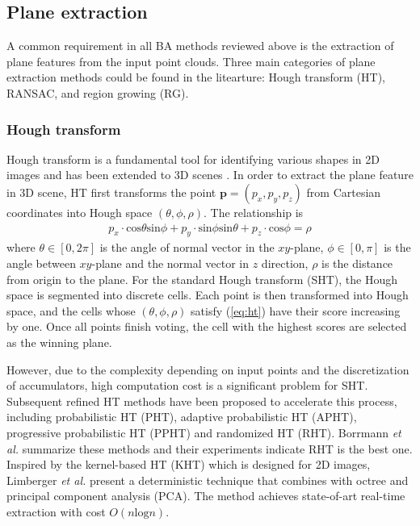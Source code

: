 \documentclass[letterpaper, 10 pt, conference]{ieeeconf}  %
\begin{document}
\subsection{Plane extraction}

A common requirement in all BA methods reviewed above is the extraction of plane features from the input point clouds. Three main categories of plane extraction methods could be found in the litearture: Hough transform (HT), RANSAC, and region growing (RG).

\subsubsection{Hough transform}

Hough transform is a fundamental tool for identifying various shapes in 2D images \cite{hough1962method} and has been extended to 3D scenes \cite{borrmann20113d}. In order to extract the plane feature in 3D scene, HT first transforms the point $\mathbf p = (p_x, p_y, p_z)$ from Cartesian coordinates into Hough space $(\theta, \phi, \rho)$. The relationship is 
\begin{align}
	p_x \cdot \text{cos} \theta \text{sin}\phi + p_y \cdot \text{sin} \phi \text{sin} \theta + p_z \cdot \text{cos} \phi = \rho \label{eq:ht}
\end{align}
where $\theta \in [0, 2\pi]$ is the angle of normal vector in the $xy$-plane, $\phi \in [0, \pi]$ is the angle between $xy$-plane and the normal vector in $z$ direction, $\rho$ is the distance from origin to the plane. For the standard Hough transform (SHT), the Hough space is segmented into discrete cells. Each point is then transformed into Hough space, and the cells whose $(\theta, \phi, \rho)$ satisfy (\ref{eq:ht}) have their score increasing by one. Once all points finish voting, the cell with the highest scores are selected as the winning plane. 

However, due to the complexity depending on input points and the discretization of accumulators, high computation cost is a significant problem for SHT. Subsequent refined HT methods have been proposed to accelerate this process, including probabilistic HT (PHT), adaptive probabilistic HT (APHT), progressive probabilistic HT (PPHT) and randomized HT (RHT). Borrmann \textit{et al.} summarize these methods \cite{borrmann20113d} and their experiments indicate RHT is the best one. {Inspired by the kernel-based HT (KHT)} \cite{fernandes2008real} {which is designed for 2D images}, Limberger \textit{et al.} \cite{limberger2015real} present a deterministic technique that combines with octree and principal component analysis (PCA). The method achieves state-of-art real-time extraction with cost $O(n\text{log}n)$.
\end{document}
